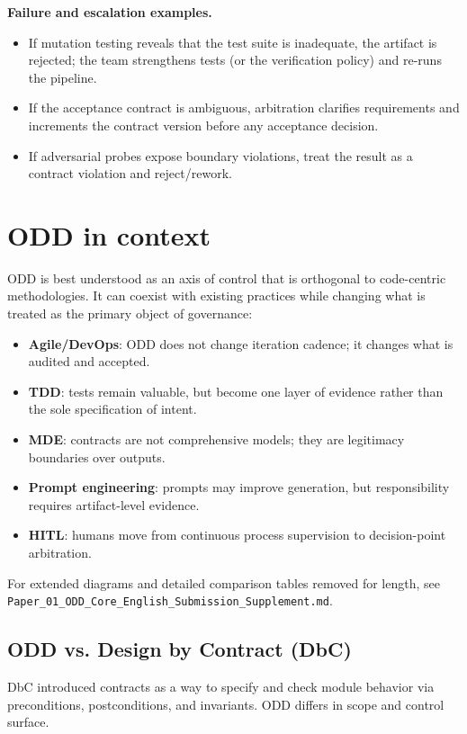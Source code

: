 \documentclass[conference]{IEEEtran}
\begin{document}
\textbf{Failure and escalation examples.}
\begin{itemize}
\item If mutation testing reveals that the test suite is inadequate, the artifact is rejected; the team strengthens tests (or the verification policy) and re-runs the pipeline.
\item If the acceptance contract is ambiguous, arbitration clarifies requirements and increments the contract version before any acceptance decision.
\item If adversarial probes expose boundary violations, treat the result as a contract violation and reject/rework.
\end{itemize}

\section{ODD in context}\label{sec:context}
ODD is best understood as an axis of control that is orthogonal to code-centric methodologies. It can coexist with existing practices while changing what is treated as the primary object of governance:
\begin{itemize}
\item \textbf{Agile/DevOps}: ODD does not change iteration cadence; it changes what is audited and accepted.
\item \textbf{TDD}: tests remain valuable, but become one layer of evidence rather than the sole specification of intent.
\item \textbf{MDE}: contracts are not comprehensive models; they are legitimacy boundaries over outputs.
\item \textbf{Prompt engineering}: prompts may improve generation, but responsibility requires artifact-level evidence.
\item \textbf{HITL}: humans move from continuous process supervision to decision-point arbitration.
\end{itemize}

For extended diagrams and detailed comparison tables removed for length, see \texttt{Paper\_01\_ODD\_Core\_English\_Submission\_Supplement.md}.


\subsection{ODD vs. Design by Contract (DbC)}
DbC \cite{meyer1992dbc} introduced contracts as a way to specify and check module behavior via preconditions, postconditions, and invariants. ODD differs in scope and control surface.
\end{document}
